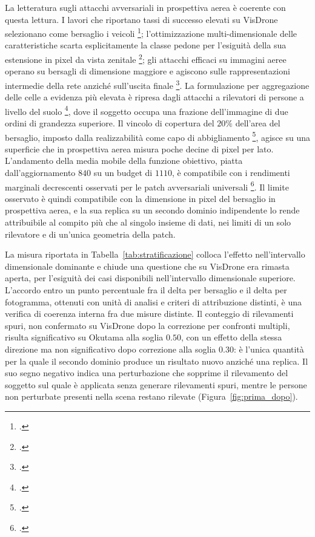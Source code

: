 \ifstampa\documentclass[a4paper,12pt,twoside,openright]{report}\else\documentclass[a4paper,12pt]{report}\fi
\newif\ifrevisione \revisionefalse
\DeclareRobustCommand{\rev}[1]{\ifrevisione{\color{blue!65!black}#1}\else#1\fi}
\begin{document}
La letteratura sugli attacchi avversariali in prospettiva aerea è coerente con questa lettura. I lavori che riportano tassi di successo elevati su VisDrone selezionano come bersaglio i veicoli \footcite{shrestha_2023}; l'ottimizzazione multi-dimensionale delle caratteristiche scarta esplicitamente la classe pedone per l'esiguità della sua estensione in pixel da vista zenitale \footcite{xi_2025_lfrap}; gli attacchi efficaci su immagini aeree operano su bersagli di dimensione maggiore e agiscono sulle rappresentazioni intermedie della rete anziché sull'uscita finale \footcite{tang_2023}. La formulazione per aggregazione delle celle a evidenza più elevata è ripresa dagli attacchi a rilevatori di persone a livello del suolo \footcite{thys_2019}, dove il soggetto occupa una frazione dell'immagine di due ordini di grandezza superiore. Il vincolo di copertura del $20\%$ dell'area del bersaglio, imposto dalla realizzabilità come capo di abbigliamento \footcite{huang_2020_upc}, agisce su una superficie che in prospettiva aerea misura poche decine di pixel per lato. L'andamento della media mobile della funzione obiettivo, piatta dall'aggiornamento $840$ su un budget di $1110$, è compatibile con i rendimenti marginali decrescenti osservati per le patch avversariali universali \footcite{brown_2017_patch}. Il limite osservato è quindi \rev{compatibile con la} dimensione in pixel del bersaglio in prospettiva aerea, e la sua replica su un secondo dominio indipendente \rev{lo rende attribuibile al compito più che al singolo insieme di dati, nei limiti di un solo rilevatore e di un'unica geometria della patch}.

La misura riportata in Tabella~\ref{tab:stratificazione} colloca l'effetto nell'intervallo dimensionale dominante e chiude una questione che su VisDrone era rimasta aperta, per l'esiguità dei casi disponibili nell'intervallo dimensionale superiore. L'accordo entro un punto percentuale fra il delta per bersaglio e il delta per fotogramma, ottenuti con unità di analisi e criteri di attribuzione distinti, è una verifica di coerenza interna fra due misure \rev{distinte}. Il conteggio di rilevamenti spuri, \rev{non confermato su VisDrone dopo la correzione per confronti multipli}, risulta significativo su Okutama alla soglia $0.50$, con un effetto della stessa direzione ma non significativo dopo correzione alla soglia $0.30$: è l'unica quantità per la quale il secondo dominio produce un risultato nuovo anziché una replica. Il suo segno negativo indica una perturbazione che sopprime il rilevamento del soggetto sul quale è applicata \rev{senza generare rilevamenti spuri, mentre le persone non perturbate presenti nella scena restano rilevate (Figura~\ref{fig:prima_dopo})}.
\end{document}
